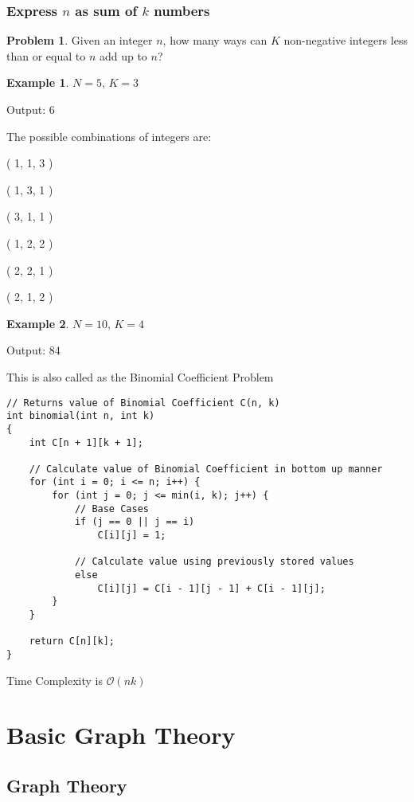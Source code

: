 \documentclass[twoside,12pt,a4paper,english]{book}
\theoremstyle{definition}
\newtheorem*{exmp}{Example}
\theoremstyle{problemstyle}
\newtheorem*{problem}{Problem} %
\theoremstyle{problemstyle}
\theoremstyle{problemstyle}
\begin{document}
\section{Express \texorpdfstring{$n$}{n} as sum of \texorpdfstring{$k$}{k} numbers}
\begin{problem}
Given an integer $n$, how many ways can $K$ non-negative
integers less than or equal to $n$ add up to $n$?
\end{problem}
\begin{exmp}
$N = 5$, $K = 3$

Output: 6

The possible combinations of integers are:

( 1, 1, 3 )

( 1, 3, 1 )

( 3, 1, 1 )

( 1, 2, 2 )

( 2, 2, 1 )

( 2, 1, 2 )
\end{exmp}
\begin{exmp}
$N = 10$, $K = 4$

Output: 84
\end{exmp}
\begin{tcolorbox}[title=Solution]

This is also called as the Binomial Coefficient Problem
\begin{lstlisting}
// Returns value of Binomial Coefficient C(n, k)
int binomial(int n, int k)
{
    int C[n + 1][k + 1];

    // Calculate value of Binomial Coefficient in bottom up manner
    for (int i = 0; i <= n; i++) {
        for (int j = 0; j <= min(i, k); j++) {
            // Base Cases
            if (j == 0 || j == i)
                C[i][j] = 1;

            // Calculate value using previously stored values
            else
                C[i][j] = C[i - 1][j - 1] + C[i - 1][j];
        }
    }

    return C[n][k];
}
\end{lstlisting}
Time Complexity is $\mathcal{O}(nk)$
\end{tcolorbox}

\part{Basic Graph Theory}
\chapter{Graph Theory}
\end{document}
